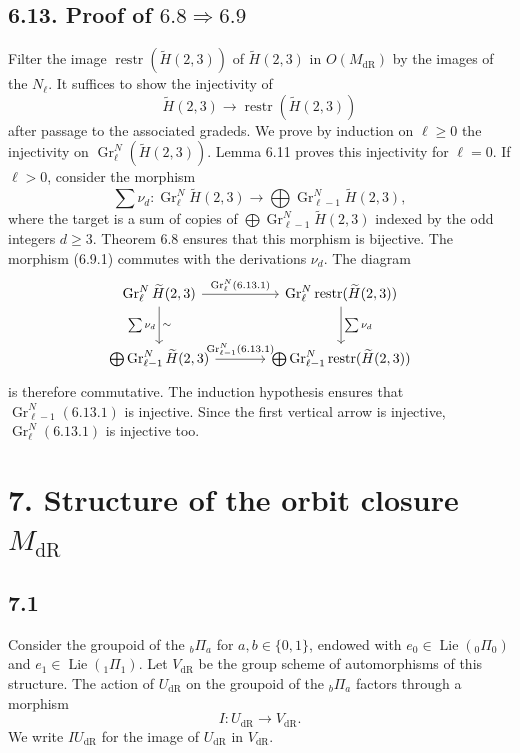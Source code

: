 \documentclass[11pt]{article}
\newcommand{\Lie}{\operatorname{Lie}}
\newcommand{\Gr}{\operatorname{Gr}}
\newcommand{\dR}{\mathrm{dR}}
\newcommand{\restr}{\operatorname{restr}}
\begin{document}
\subsection*{6.13. Proof of $6.8\Rightarrow6.9$}
Filter the image $\restr(\widetilde H(2,3))$ of $\widetilde H(2,3)$ in $O(M_{\dR})$ by the images of the $N_\ell$.
It suffices to show the injectivity of
\begin{equation}
 \widetilde H(2,3)\longrightarrow\restr(\widetilde H(2,3))
\tag{6.13.1}
\end{equation}
after passage to the associated gradeds.
We prove by induction on $\ell\geq0$ the injectivity on $\Gr^N_\ell(\widetilde H(2,3))$.
Lemma 6.11 proves this injectivity for $\ell=0$.
If $\ell>0$, consider the morphism
\[
 \sum\nu_d:\Gr^N_\ell\widetilde H(2,3)\longrightarrow\bigoplus\Gr^N_{\ell-1}\widetilde H(2,3),
\]
where the target is a sum of copies of $\bigoplus\Gr^N_{\ell-1}\widetilde H(2,3)$ indexed by the odd integers $d\geq3$.
Theorem 6.8 ensures that this morphism is bijective.
The morphism (6.9.1) commutes with the derivations $\nu_d$.
The diagram
\[
\begin{tikzcd}[column sep=large,row sep=large]
\Gr^N_\ell\widetilde H(2,3) \arrow[r,"\Gr^N_\ell(6.13.1)"] \arrow[d,"\sum\nu_d"',"\sim"]
& \Gr^N_\ell\restr(\widetilde H(2,3)) \arrow[d,"\sum\nu_d"] \\
\bigoplus\Gr^N_{\ell-1}\widetilde H(2,3) \arrow[r,"\Gr^N_{\ell-1}(6.13.1)"]
& \bigoplus\Gr^N_{\ell-1}\restr(\widetilde H(2,3))
\end{tikzcd}
\]
is therefore commutative.
The induction hypothesis ensures that $\Gr^N_{\ell-1}(6.13.1)$ is injective.
Since the first vertical arrow is injective, $\Gr^N_\ell(6.13.1)$ is injective too.

\section*{7. Structure of the orbit closure $M_{\dR}$}

\subsection*{7.1}
Consider the groupoid of the ${}_b\Pi_a$ for $a,b\in\{0,1\}$, endowed with $e_0\in\Lie({}_0\Pi_0)$ and $e_1\in\Lie({}_1\Pi_1)$.
Let $V_{\dR}$ be the group scheme of automorphisms of this structure.
The action of $U_{\dR}$ on the groupoid of the ${}_b\Pi_a$ factors through a morphism
\begin{equation}
 I:U_{\dR}\longrightarrow V_{\dR}.
\tag{7.1.1}
\end{equation}
We write $IU_{\dR}$ for the image of $U_{\dR}$ in $V_{\dR}$.
\end{document}
